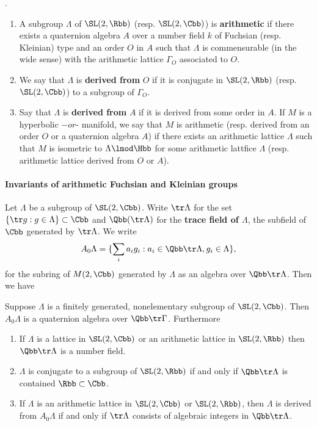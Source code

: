 \begin{definition}.\linebreak
    \begin{enumerate}
        \item     A subgroup $\Lambda$ of $\SL(2,\Rbb)$ (resp. $\SL(2,\Cbb)$) is \textbf{arithmetic} if there exists a quaternion algebra $A$ over a number field $k$ of Fuchsian (resp. Kleinian) type and an order $O$ in $A$ such that $\Lambda$ is commensurable (in the wide sense) with the arithmetic lattice $\Gamma_{O}$ associated to $O$.
        \item  We say that $\Lambda$ is \textbf{derived from} $O$ if it is conjugate in $\SL(2,\Rbb)$ (resp. $\SL(2,\Cbb)$) to a subgroup of $\Gamma_O$.
        \item Say that $\Lambda$ is \textbf{derived from} $A$ if it is derived from some order in $A$. If $M$ is a hyperbolic $- or $- manifold, we say that $M$ is arithmetic (resp. derived from an order $O$ or a quaternion algebra $A$) if there exists an arithmetic lattice $\Lambda$  such that $M$ is isometric to $\Lambda \lmod \Hbb$ for some arithmetic lattfice $\Lambda$ (resp. arithmetic lattice derived from $O$ or $A$).
    \end{enumerate}
\end{definition}

\paragraph{Invariants of arithmetic Fuchsian and Kleinian groups}
Let $\Lambda$ be a subgroup of $\SL(2,\Cbb)$.  Write $\tr \Lambda$ for the set $\{\tr g : g\in \Lambda\} \subset \Cbb$ and  $\Qbb(\tr \Lambda)$ for the \textbf{trace field of $\Lambda$}, the subfield of $\Cbb$ generated by $\tr \Lambda$. We write
\begin{align*}
    A_0\Lambda = \{ \sum_i a_i g_i : a_i \in \Qbb \tr \Lambda, g_i \in \Lambda\},
\end{align*}
for the subring of $M(2,\Cbb)$ generated by $\Lambda$ as an algebra over $\Qbb \tr \Lambda$. Then we have
\begin{proposition}
    Suppose $\Lambda$ is a finitely generated, nonelementary subgroup of $\SL(2,\Cbb)$. Then $A_0\Lambda$ is a quaternion algebra over $\Qbb \tr \Gamma$. Furthermore
    \begin{enumerate}
        \item If $\Lambda$ is a lattice in $\SL(2,\Cbb)$ or an arithmetic lattice in $\SL(2,\Rbb)$ then $\Qbb \tr \Lambda$ is a number field.
        \item $\Lambda$ is conjugate to a subgroup of $\SL(2,\Rbb)$ if and only if $\Qbb \tr \Lambda$ is contained $\Rbb \subset \Cbb$.
        \item If $\Lambda$ is an arithmetic lattice in $\SL(2,\Cbb)$ or $\SL(2,\Rbb)$, then $\Lambda$ is derived from $A_0 \Lambda$ if and only if $\tr \Lambda$ consists of algebraic integers in $\Qbb \tr \Lambda$.
    \end{enumerate}
\end{proposition}



